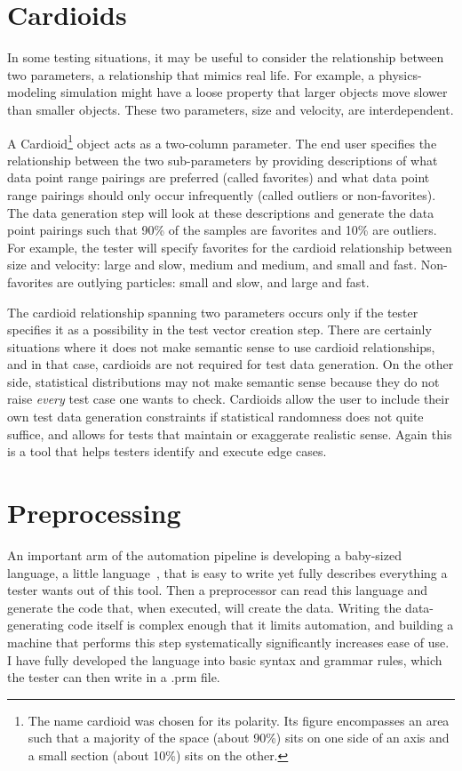 \section{Cardioids}

In some testing situations, it may be useful to consider the relationship between two parameters, a relationship that mimics real life. For example, a physics-modeling simulation might have a loose property that larger objects move slower than smaller objects. These two parameters, size and velocity, are interdependent.

A Cardioid\footnote{The name cardioid was chosen for its polarity. Its figure encompasses an area such that a majority of the space (about 90\%) sits on one side of an axis and a small section (about 10\%) sits on the other.} object acts as a two-column parameter. The end user specifies the relationship between the two sub-parameters by providing descriptions of what data point range pairings are preferred (called favorites) and what data point range pairings should only occur infrequently (called outliers or non-favorites). The data generation step will look at these descriptions and generate the data point pairings such that 90\% of the samples are favorites and 10\% are outliers. For example, the tester will specify favorites for the cardioid relationship between size and velocity: large and slow, medium and medium, and small and fast. Non-favorites are outlying particles: small and slow, and large and fast.

The cardioid relationship spanning two parameters occurs only if the tester specifies it as a possibility in the test vector creation step. There are certainly situations where it does not make semantic sense to use cardioid relationships, and in that case, cardioids are not required for test data generation. On the other side, statistical distributions may not make semantic sense because they do not raise \textit{every} test case one wants to check. Cardioids allow the user to include their own test data generation constraints if statistical randomness does not quite suffice, and allows for tests that maintain or exaggerate realistic sense. Again this is a tool that helps testers identify and execute edge cases.

\section{Preprocessing}

An important arm of the automation pipeline is developing a baby-sized language, a little language~\cite{Bentley:1986:PP:600875}, that is easy to write yet fully describes everything a tester wants out of this tool. Then a preprocessor can read this language and generate the code that, when executed, will create the data. Writing the data-generating code itself is complex enough that it limits automation, and building a machine that performs this step systematically significantly increases ease of use. I have fully developed the language into basic syntax and grammar rules, which the tester can then write in a .prm file.

